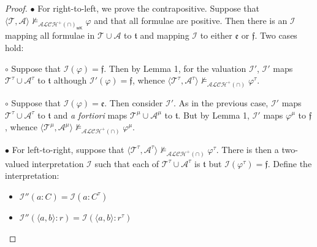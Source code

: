 \documentclass[letterpaper]{article} %
\theoremstyle{definition}
\theoremstyle{definition}
\theoremstyle{definition}
\theoremstyle{definition}
\theoremstyle{definition}
\begin{document}
\begin{proof}
    \noindent $\bullet$ For right-to-left, we prove the contrapositive. Suppose that $\langle \mathcal{T},\mathcal{A}\rangle\nvDash_{\mathcal{ALCH}^+(\cap)_{\mathsf{wK}}}\varphi$ and that all formulae are positive. Then there is an $\mathcal{I}$ mapping all formulae in $\mathcal{T}\cup\mathcal{A}$ to $\mathfrak{t}$ and mapping $\mathcal{I}$ to either $\mathfrak{e}$ or $\mathfrak{f}$. Two cases hold:

    \vspace{.1cm}
    
    \noindent$\circ$ Suppose that $\mathcal{I}(\varphi)=\mathfrak{f}$. Then by Lemma 1, for the valuation $\mathcal{I}'$, $\mathcal{I}'$ maps $\mathcal{T}^{\tau}\cup\mathcal{A}^{\tau}$ to $\mathfrak{t}$ although $\mathcal{I}'(\varphi)=\mathfrak{f}$, whence $\langle\mathcal{T}^{\tau},\mathcal{A}^{\tau}\rangle\nvDash_{\mathcal{ALCH^+(\cap)}}\varphi^{\tau}$.

     \vspace{.1cm}
    
    \noindent$\circ$ Suppose that $\mathcal{I}(\varphi)=\mathfrak{e}$. Then consider $\mathcal{I}'$. As in the previous case, $\mathcal{I}'$ maps $\mathcal{T}^{\tau}\cup\mathcal{A}^{\tau}$ to $\mathfrak{t}$ and \emph{a fortiori} maps $\mathcal{T}^{\mu}\cup\mathcal{A}^{\mu}$ to $\mathfrak{t}$. But by Lemma 1, $\mathcal{I}'$ maps $\varphi^{\mu}$ to $\mathfrak{f}$, whence $\langle\mathcal{T}^{\mu},\mathcal{A}^{\mu}\rangle\nvDash_{\mathcal{ALCH}^+(\cap)}\varphi^{\mu}$.

     \vspace{.2cm}
    
    \noindent$\bullet$ For left-to-right, suppose that $\langle\mathcal{T}^{\tau},\mathcal{A}^{\tau}\rangle\nvDash_{\mathcal{ALCH}^+(\cap)}\varphi^{\tau}$. There is then a two-valued interpretation $\mathcal{I}$ such that each of $\mathcal{T}^{\tau}\cup\mathcal{A}^{\tau}$ is $\mathfrak{t}$ but $\mathcal{I}(\varphi^{\tau})=\mathfrak{f}$. Define the  interpretation:

    \begin{center}
        \begin{itemize}
        \item $\mathcal{I}''(a:C)=\mathcal{I}(a:C^{\tau})$
        \item $\mathcal{I}''(\langle a,b\rangle:r)=\mathcal{I}(\langle a,b\rangle:r^{\tau})$
        \end{itemize}
    \end{center}


\end{proof}
\end{document}
